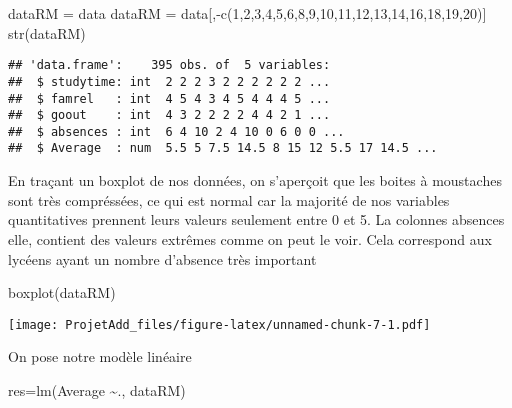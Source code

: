 \documentclass[
]{article}
\newenvironment{Shaded}{\begin{snugshade}}{\end{snugshade}}
\newcommand{\DecValTok}[1]{\textcolor[rgb]{0.00,0.00,0.81}{#1}}
\newcommand{\FunctionTok}[1]{\textcolor[rgb]{0.00,0.00,0.00}{#1}}
\newcommand{\NormalTok}[1]{#1}
\newcommand{\OtherTok}[1]{\textcolor[rgb]{0.56,0.35,0.01}{#1}}
\newcommand{\SpecialCharTok}[1]{\textcolor[rgb]{0.00,0.00,0.00}{#1}}
\begin{document}
\begin{Shaded}
\begin{Highlighting}[]
\NormalTok{dataRM }\OtherTok{=}\NormalTok{ data}
\NormalTok{dataRM }\OtherTok{=}\NormalTok{ data[,}\SpecialCharTok{{-}}\FunctionTok{c}\NormalTok{(}\DecValTok{1}\NormalTok{,}\DecValTok{2}\NormalTok{,}\DecValTok{3}\NormalTok{,}\DecValTok{4}\NormalTok{,}\DecValTok{5}\NormalTok{,}\DecValTok{6}\NormalTok{,}\DecValTok{8}\NormalTok{,}\DecValTok{9}\NormalTok{,}\DecValTok{10}\NormalTok{,}\DecValTok{11}\NormalTok{,}\DecValTok{12}\NormalTok{,}\DecValTok{13}\NormalTok{,}\DecValTok{14}\NormalTok{,}\DecValTok{16}\NormalTok{,}\DecValTok{18}\NormalTok{,}\DecValTok{19}\NormalTok{,}\DecValTok{20}\NormalTok{)]}
\FunctionTok{str}\NormalTok{(dataRM)}
\end{Highlighting}
\end{Shaded}

\begin{verbatim}
## 'data.frame':    395 obs. of  5 variables:
##  $ studytime: int  2 2 2 3 2 2 2 2 2 2 ...
##  $ famrel   : int  4 5 4 3 4 5 4 4 4 5 ...
##  $ goout    : int  4 3 2 2 2 2 4 4 2 1 ...
##  $ absences : int  6 4 10 2 4 10 0 6 0 0 ...
##  $ Average  : num  5.5 5 7.5 14.5 8 15 12 5.5 17 14.5 ...
\end{verbatim}

En traçant un boxplot de nos données, on s'aperçoit que les boites à
moustaches sont très compréssées, ce qui est normal car la majorité de
nos variables quantitatives prennent leurs valeurs seulement entre 0 et
5. La colonnes absences elle, contient des valeurs extrêmes comme on
peut le voir. Cela correspond aux lycéens ayant un nombre d'absence très
important

\begin{Shaded}
\begin{Highlighting}[]
\FunctionTok{boxplot}\NormalTok{(dataRM)}
\end{Highlighting}
\end{Shaded}

\texttt{[image: ProjetAdd\_files/figure-latex/unnamed-chunk-7-1.pdf]}

On pose notre modèle linéaire

\begin{Shaded}
\begin{Highlighting}[]
\NormalTok{res}\OtherTok{=}\FunctionTok{lm}\NormalTok{(Average }\SpecialCharTok{\textasciitilde{}}\NormalTok{., dataRM)}
\end{Highlighting}
\end{Shaded}
\end{document}

